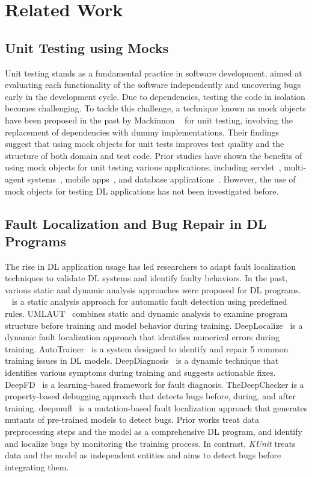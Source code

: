 \section[Related]{Related Work}

\label{sec:relatedwork}
\subsection{Unit Testing using Mocks}
Unit testing stands as a fundamental practice in software development,
aimed at evaluating each functionality of the software independently and uncovering bugs early in the development cycle.
Due to dependencies, testing the code in isolation becomes challenging.
To tackle this challenge, a technique known as mock objects have been proposed in the past by Mackinnon \etal~\cite{mackinnon2000endotesting} for unit testing, involving the replacement of dependencies with dummy implementations.
Their findings suggest that using mock objects for unit tests improves test quality and the structure of both domain and test code.
Prior studies have shown the benefits of using mock objects for unit testing various applications, including servlet~\cite{thomas2002mock}, multi-agent systems~\cite{coelho2006unit}, mobile apps~\cite{fazzini2020framework}, and database applications~\cite{taneja2010moda}.
However, the use of mock objects for testing DL applications has not been investigated before.


\subsection{Fault Localization and Bug Repair in DL Programs}
The rise in DL application usage has led researchers to adapt fault localization techniques to validate DL systems and identify faulty behaviors. In the past, various static and dynamic analysis approaches were proposed for DL programs.
\nlint~\cite{nikanjam2021neuralint} is a static analysis approach for automatic fault detection using predefined rules.
UMLAUT~\cite{schoop2021umlaut} combines static and dynamic analysis to examine program structure before training and model behavior during training.
DeepLocalize~\cite{wardat21DeepLocalize} is a dynamic fault localization approach that identifies 
numerical errors during training.
AutoTrainer~\cite{Zhang21Autotrainer} is a system designed to identify and repair 5 common training issues in DL models. 
DeepDiagnosis~\cite{wardat22DeepDiagnosis} is a dynamic 
technique that identifies various symptoms during training and suggests actionable fixes.
DeepFD~\cite{cao2022deepfd} is a learning-based framework for fault diagnosis.
TheDeepChecker \cite{BraiekDeepChecker} is a property-based debugging approach that detects bugs before, during, and after training.
deepmufl~\cite{ghanbari2023deepmufl} is a mutation-based fault localization approach that generates mutants of pre-trained models to detect bugs.
Prior works treat data preprocessing steps and the model as a comprehensive DL program, 
and identify and localize bugs by monitoring the training process.
In contrast, {\em KUnit} treats data and the model as independent entities and aims to detect bugs before integrating them.
